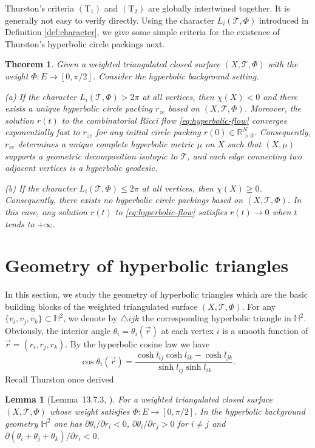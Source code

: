 \documentclass[12pt]{amsart}
\numberwithin{equation}{section}
\newtheorem{theo}[prop]{Theorem}
\newtheorem{lem}[prop]{Lemma}
\begin{document}
Thurston's criteria $(\mathrm{T}_1)$ and $(\mathrm{T}_2)$ are globally intertwined together. It is generally not easy to verify
directly. Using the character $L_i(\mathcal{T},\Phi)$ introduced in Definition \ref{def:character}, we give some simple criteria for the
existence of Thurston's hyperbolic circle packings next.

\begin{theo}\label{thm:4.1}
Given a weighted triangulated closed surface $(X,\mathcal{T},\Phi)$ with the weight $\Phi: E \to [0,\pi/2]$.
Consider the hyperbolic background setting.

(a) If the character $L_i(\mathcal{T},\Phi) > 2\pi$ at all vertices, then $\chi(X) < 0$ and there exists a unique hyperbolic
circle packing $r_{ze}$ based on $(X,\mathcal{T},\Phi)$. Moreover, the solution $r(t)$ to the combinatorial Ricci flow \eqref{eq:hyperbolic-flow}
converges exponentially fast to $r_{ze}$ for any initial circle packing $r(0) \in \mathbb{R}^N_{>0}$. Consequently, $r_{ze}$ determines
a unique complete hyperbolic metric $\mu$ on $X$ such that $(X,\mu)$ supports a geometric decomposition isotopic
to $\mathcal{T}$, and each edge connecting two adjacent vertices is a hyperbolic geodesic.

(b) If the character $L_i(\mathcal{T},\Phi) \leq 2\pi$ at all vertices, then $\chi(X) \geq 0$. Consequently, there exists no
hyperbolic circle packings based on $(X,\mathcal{T},\Phi)$. In this case, any solution $r(t)$ to \eqref{eq:hyperbolic-flow} satisfies $r(t) \to 0$
when $t$ tends to $+\infty$.
\end{theo}

\section{Geometry of hyperbolic triangles}\label{sec:triangles}

In this section, we study the geometry of hyperbolic triangles which are the basic building blocks of the
weighted triangulated surface $(X,\mathcal{T},\Phi)$. For any $\{v_i, v_j, v_k\} \subset \mathbb{H}^2$, we denote by $\triangle ijk$ the corresponding
hyperbolic triangle in $\mathbb{H}^2$. Obviously, the interior angle $\theta_i = \theta_i(\vec{r})$ at each vertex $i$ is a smooth function
of $\vec{r} = (r_i, r_j, r_k)$. By the hyperbolic cosine law we have
\[
\cos\theta_i(\vec{r}) = \frac{\cosh l_{ij} \cosh l_{ik} - \cosh l_{jk}}{\sinh l_{ij} \sinh l_{ik}}.
\]
Recall Thurston once derived
\begin{lem}[Lemma~13.7.3, \cite{Thurston}]\label{lem:Thurston}
For a weighted triangulated closed surface $(X,\mathcal{T},\Phi)$ whose weight
satisfies $\Phi : E \to [0,\pi/2]$. In the hyperbolic background geometry $\mathbb{H}^2$ one has $\partial\theta_i/\partial r_i < 0$, $\partial\theta_i/\partial r_j > 0$
for $i \neq j$ and $\partial(\theta_i + \theta_j + \theta_k)/\partial r_i < 0$.
\end{lem}
\end{document}
